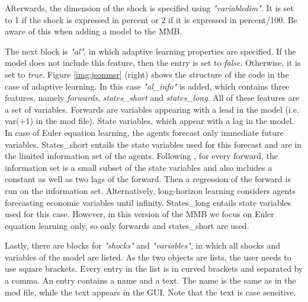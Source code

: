 Afterwards, the dimension of the shock is specified using \textit{"variabledim"}. It is set to 1 if the shock is expressed in percent or 2 if it is expressed in percent/100. Be aware of this when adding a model to the MMB.

The next block is \textit{"al"}, in which adaptive learning properties are specified. If the model does not include this feature, then the entry is set to \textit{false}. Otherwise, it is set to \textit{true}. Figure \ref{img:jsonmsr} (right) shows the structure of the code in the case of adaptive learning. In this case \textit{"al\_info"} is added, which contains three features, namely \textit{forwards}, \textit{states\_short} and \textit{states\_long}. All of these features are a set of variables. Forwards are variables appearing with a lead in the model (i.e. var(+1) in the mod file). State variables, which appear with a lag in the model. In case of Euler equation learning, the agents forecast only immediate future variables. States\_short entails the state variables used for this forecast and are in the limited information set of the agents. Following \cite{Slobodyan2012}, for every forward, the information set is a small subset of the state variables and also includes a constant as well as two lags of the forward. Then a regression of the forward is run on the information set. Alternatively, long-horizon learning considers agents forecasting economic variables until infinity. States\_long entails state variables used for this case. However, in this version of the MMB we focus on Euler equation learning only, so only forwards and states\_short are used.  

Lastly, there are blocks for \textit{"shocks"} and \textit{"variables"}, in which all shocks and variables of the model are listed. As the two objects are lists, the user needs to use square brackets. Every entry in the list is in curved brackets and separated by a comma. An entry contains a name and a text. The name is the same as in the mod file, while the text appears in the GUI. Note that the text is case sensitive.